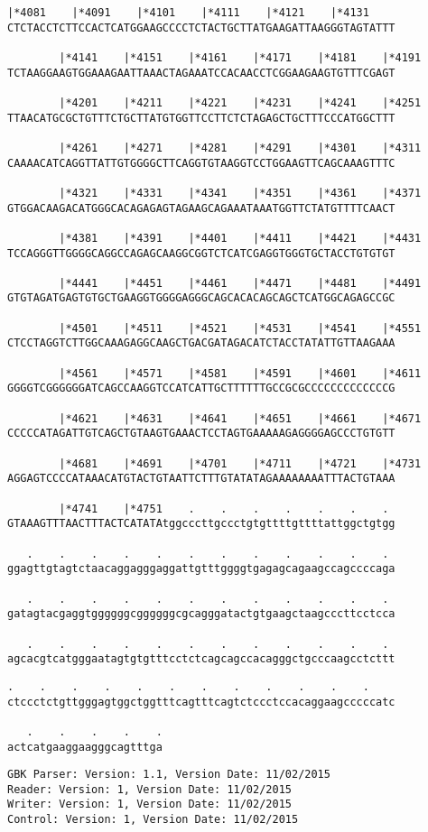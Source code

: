 \documentclass{article}
\begin{document}
\newpage
\begin{Verbatim}[fontfamily=courier]
        |*4081    |*4091    |*4101    |*4111    |*4121    |*4131
CTCTACCTCTTCCACTCATGGAAGCCCCTCTACTGCTTATGAAGATTAAGGGTAGTATTT

        |*4141    |*4151    |*4161    |*4171    |*4181    |*4191
TCTAAGGAAGTGGAAAGAATTAAACTAGAAATCCACAACCTCGGAAGAAGTGTTTCGAGT

        |*4201    |*4211    |*4221    |*4231    |*4241    |*4251
TTAACATGCGCTGTTTCTGCTTATGTGGTTCCTTCTCTAGAGCTGCTTTCCCATGGCTTT

        |*4261    |*4271    |*4281    |*4291    |*4301    |*4311
CAAAACATCAGGTTATTGTGGGGCTTCAGGTGTAAGGTCCTGGAAGTTCAGCAAAGTTTC

        |*4321    |*4331    |*4341    |*4351    |*4361    |*4371
GTGGACAAGACATGGGCACAGAGAGTAGAAGCAGAAATAAATGGTTCTATGTTTTCAACT

        |*4381    |*4391    |*4401    |*4411    |*4421    |*4431
TCCAGGGTTGGGGCAGGCCAGAGCAAGGCGGTCTCATCGAGGTGGGTGCTACCTGTGTGT

        |*4441    |*4451    |*4461    |*4471    |*4481    |*4491
GTGTAGATGAGTGTGCTGAAGGTGGGGAGGGCAGCACACAGCAGCTCATGGCAGAGCCGC

        |*4501    |*4511    |*4521    |*4531    |*4541    |*4551
CTCCTAGGTCTTGGCAAAGAGGCAAGCTGACGATAGACATCTACCTATATTGTTAAGAAA

        |*4561    |*4571    |*4581    |*4591    |*4601    |*4611
GGGGTCGGGGGGATCAGCCAAGGTCCATCATTGCTTTTTTGCCGCGCCCCCCCCCCCCCG

        |*4621    |*4631    |*4641    |*4651    |*4661    |*4671
CCCCCATAGATTGTCAGCTGTAAGTGAAACTCCTAGTGAAAAAGAGGGGAGCCCTGTGTT

        |*4681    |*4691    |*4701    |*4711    |*4721    |*4731
AGGAGTCCCCATAAACATGTACTGTAATTCTTTGTATATAGAAAAAAAATTTACTGTAAA

        |*4741    |*4751    .    .    .    .    .    .    . 
GTAAAGTTTAACTTTACTCATATAtggcccttgccctgtgttttgttttattggctgtgg

   .    .    .    .    .    .    .    .    .    .    .    . 
ggagttgtagtctaacaggagggaggattgtttggggtgagagcagaagccagccccaga

   .    .    .    .    .    .    .    .    .    .    .    . 
gatagtacgaggtggggggcggggggcgcagggatactgtgaagctaagcccttcctcca

   .    .    .    .    .    .    .    .    .    .    .    . 
agcacgtcatgggaatagtgtgtttcctctcagcagccacagggctgcccaagcctcttt

\end{Verbatim}
\newpage
\begin{Verbatim}[fontfamily=courier]
   .    .    .    .    .    .    .    .    .    .    .    . 
ctccctctgttgggagtggctggtttcagtttcagtctccctccacaggaagcccccatc

   .    .    .    .    .
actcatgaaggaagggcagtttga
\end{Verbatim}
\newpage
\begin{Verbatim}[fontfamily=courier]
GBK Parser: Version: 1.1, Version Date: 11/02/2015
Reader: Version: 1, Version Date: 11/02/2015
Writer: Version: 1, Version Date: 11/02/2015
Control: Version: 1, Version Date: 11/02/2015
\end{Verbatim}
\end{document}

